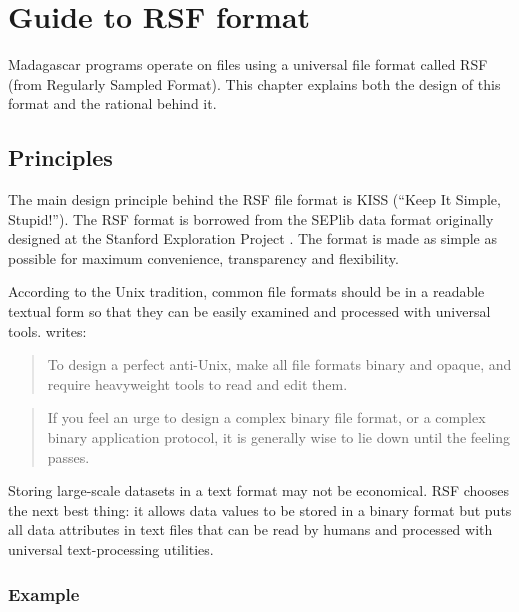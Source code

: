 \chapter{Guide to RSF format}


Madagascar programs operate on files using a universal file format
called RSF (from Regularly Sampled Format). This chapter explains both
the design of this format and the rational behind it.

\section{Principles}

The main design principle behind the RSF file format is KISS (``Keep It
Simple, Stupid!''). The RSF format is borrowed from the SEPlib data format
originally designed at the Stanford Exploration Project
\cite[]{Claerbout.sep.70.413}. The format is made as simple as possible for
maximum convenience, transparency and flexibility.

According to the Unix tradition, common file formats should be in a readable
textual form so that they can be easily examined and processed with universal
tools.  \cite{taoup} writes:
\begin{quote}
  To design a perfect anti-Unix, make all file formats binary and opaque, and
  require heavyweight tools to read and edit them.
\end{quote}
\begin{quote}
  If you feel an urge to design a complex binary file format, or a complex
  binary application protocol, it is generally wise to lie down until the
  feeling passes.
\end{quote}

Storing large-scale datasets in a text format may not be economical. RSF
chooses the next best thing: it allows data values to be stored in a binary
format but puts all data attributes in text files that can be read by humans
and processed with universal text-processing utilities.

\subsection{Example}

